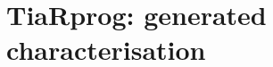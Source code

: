 \documentclass[11pt]{article}
\begin{document}
\section*{TiaRprog: generated characterisation}

\end{document}
